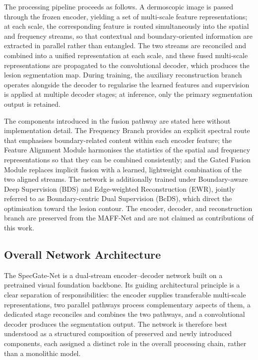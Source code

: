 The processing pipeline proceeds as follows. A dermoscopic image is passed through the frozen encoder, yielding a set of multi-scale feature representations; at each scale, the corresponding feature is routed simultaneously into the spatial and frequency streams, so that contextual and boundary-oriented information are extracted in parallel rather than entangled. The two streams are reconciled and combined into a unified representation at each scale, and these fused multi-scale representations are propagated to the convolutional decoder, which produces the lesion segmentation map. During training, the auxiliary reconstruction branch operates alongside the decoder to regularise the learned features and supervision is applied at multiple decoder stages; at inference, only the primary segmentation output is retained.

The components introduced in the fusion pathway are stated here without implementation detail. The Frequency Branch provides an explicit spectral route that emphasises boundary-related content within each encoder feature; the Feature Alignment Module harmonises the statistics of the spatial and frequency representations so that they can be combined consistently; and the Gated Fusion Module replaces implicit fusion with a learned, lightweight combination of the two aligned streams. The network is additionally trained under Boundary-aware Deep Supervision (BDS) and Edge-weighted Reconstruction (EWR), jointly referred to as Boundary-centric Dual Supervision (BcDS), which direct the optimisation toward the lesion contour. The encoder, decoder, and reconstruction branch are preserved from the MAFF-Net and are not claimed as contributions of this work.

\subsection{Overall Network Architecture}

The SpecGate-Net is a dual-stream encoder--decoder network built on a pretrained visual foundation backbone. Its guiding architectural principle is a clear separation of responsibilities: the encoder supplies transferable multi-scale representations, two parallel pathways process complementary aspects of them, a dedicated stage reconciles and combines the two pathways, and a convolutional decoder produces the segmentation output. The network is therefore best understood as a structured composition of preserved and newly introduced components, each assigned a distinct role in the overall processing chain, rather than a monolithic model.

